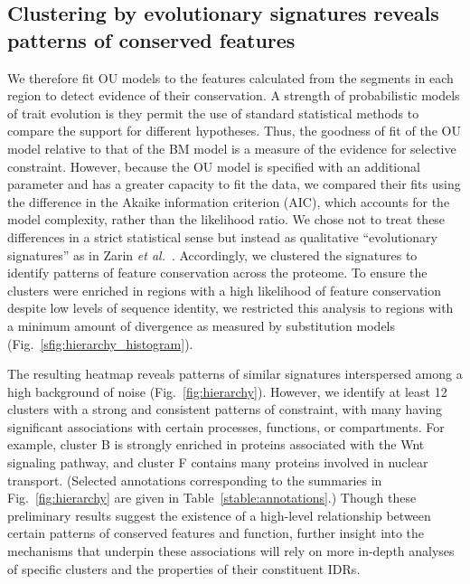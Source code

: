 
\subsection{Clustering by evolutionary signatures reveals patterns of conserved features}
We therefore fit OU models to the features calculated from the segments in each region to detect evidence of their conservation. A strength of probabilistic models of trait evolution is they permit the use of standard statistical methods to compare the support for different hypotheses. Thus, the goodness of fit of the OU model relative to that of the BM model is a measure of the evidence for selective constraint. However, because the OU model is specified with an additional parameter and has a greater capacity to fit the data, we compared their fits using the difference in the Akaike information criterion (AIC), which accounts for the model complexity, rather than the likelihood ratio. We chose not to treat these differences in a strict statistical sense but instead as qualitative ``evolutionary signatures'' as in Zarin \textit{et al.}~\cite{Zarin2019}. Accordingly, we clustered the signatures to identify patterns of feature conservation across the proteome. To ensure the clusters were enriched in regions with a high likelihood of feature conservation despite low levels of sequence identity, we restricted this analysis to regions with a minimum amount of divergence as measured by substitution models (Fig.~\ref{sfig:hierarchy_histogram}).


The resulting heatmap reveals patterns of similar signatures interspersed among a high background of noise (Fig.~\ref{fig:hierarchy}). However, we identify at least 12 clusters with a strong and consistent patterns of constraint, with many having significant associations with certain processes, functions, or compartments. For example, cluster B is strongly enriched in proteins associated with the Wnt signaling pathway, and cluster F contains many proteins involved in nuclear transport. (Selected annotations corresponding to the summaries in Fig.~\ref{fig:hierarchy} are given in Table~\ref{stable:annotations}.) Though these preliminary results suggest the existence of a high-level relationship between certain patterns of conserved features and function, further insight into the mechanisms that underpin these associations will rely on more in-depth analyses of specific clusters and the properties of their constituent IDRs.

